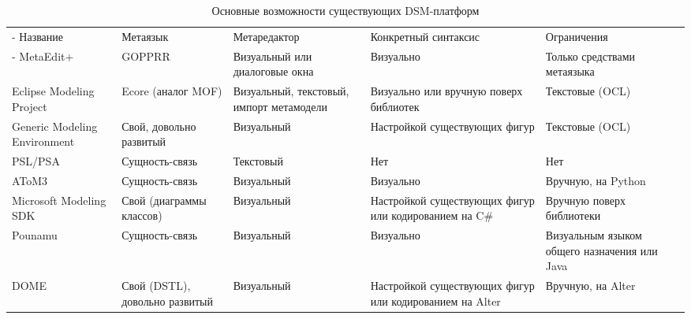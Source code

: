 \begin{table}[ht]
\begin{small}
	\begin{longtabu} {| X[1 l p] | X[1 l p] | X[1 l p] | X[1 l p] |X[1 l p] |}
		\caption{Основные возможности существующих DSM-платформ} \\
		\tabucline-
		 Название                    & Метаязык                        & Метаредактор                                            & Конкретный синтаксис                                     & Ограничения                                    \\
		\tabucline-
		\everyrow{\tabucline-}
		MetaEdit+                    & GOPPRR                          & Визуальный или диалоговые окна                          & Визуально                                                & Только средствами метаязыка                    \\
		Eclipse Modeling Project     & Ecore (аналог MOF)              & Визуальный, текстовый, импорт метамодели                & Визуально или вручную поверх библиотек                   & Текстовые (OCL)                                \\
		Generic Modeling Environment & Свой, довольно развитый         & Визуальный                                              & Настройкой существующих фигур                            & Текстовые (OCL)                                \\
		PSL/PSA                      & Сущность-связь                  & Текстовый                                               & Нет                                                      & Нет                                            \\
		AToM3                        & Сущность-связь                  & Визуальный                                              & Визуально                                                & Вручную, на Python                             \\
		Microsoft Modeling SDK       & Свой (диаграммы классов)        & Визуальный                                              & Настройкой существующих фигур или кодированием на C\#    & Вручную поверх библиотеки                      \\
		Pounamu                      & Сущность-связь                  & Визуальный                                              & Визуально                                                & Визуальным языком общего назначения или Java   \\
		DOME                         & Свой (DSTL), довольно развитый  & Визуальный                                              & Настройкой существующих фигур или кодированием на Alter  & Вручную, на Alter                              \\

\end{longtabu}
\end{small}
\end{table}
